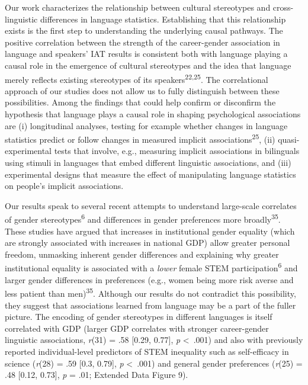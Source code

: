 \documentclass[11pt]{wlscirep}
\begin{document}
Our work characterizes the relationship between cultural stereotypes and cross-linguistic differences in language statistics. Establishing that this relationship exists is the first step to understanding the underlying causal pathways. The positive correlation between the strength of the career-gender association in language and speakers' IAT results is consistent both with language playing a causal role in the emergence of cultural stereotypes and the idea that language merely reflects existing stereotypes of its speakers\textsuperscript{22,25}. The correlational approach of our studies does not allow us to fully distinguish between these possibilities. Among the findings that could help confirm or disconfirm the hypothesis that language plays a causal role in shaping psychological associations are (i) longitudinal analyses, testing for example whether changes in language statistics predict or follow changes in measured implicit associations\textsuperscript{25}, (ii) quasi-experimental tests that involve, e.g., measuring implicit associations in bilinguals using stimuli in languages that embed different linguistic associations, and (iii) experimental designs that measure the effect of manipulating language statistics on people's implicit associations.

Our results speak to several recent attempts to understand large-scale correlates of gender stereotypes\textsuperscript{6} and differences in gender preferences more broadly\textsuperscript{35}. These studies have argued that increases in institutional gender equality (which are strongly associated with increases in national GDP) allow greater personal freedom, unmasking inherent gender differences and explaining why greater institutional equality is associated with a \textit{lower} female STEM participation\textsuperscript{6} and larger gender differences in preferences (e.g., women being more risk averse and less patient than men)\textsuperscript{35}. Although our results do not contradict this possibility, they suggest that associations learned from language may be a part of the fuller picture. The encoding of gender stereotypes in different languages is itself correlated with GDP (larger GDP correlates with stronger career-gender linguistic associations, \emph{r}(31) = .58 {[}0.29, 0.77{]}, \emph{p} \textless\ .001) and also with previously reported individual-level predictors of STEM inequality such as self-efficacy in science  (\emph{r}(28) = .59 {[}0.3, 0.79{]}, \emph{p} \textless\ .001) and general gender preferences (\emph{r}(25) = .48 {[}0.12, 0.73{]}, \emph{p} = .01; Extended Data Figure 9). 
\end{document}
